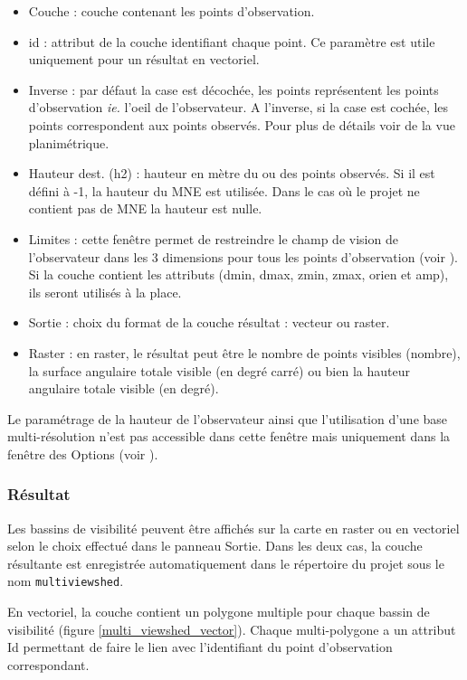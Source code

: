 \documentclass{report}
\begin{document}
\begin{itemize}
	\item Couche : couche contenant les points d'observation.
	\item id : attribut de la couche identifiant chaque point. Ce paramètre est utile uniquement pour un résultat en vectoriel.
	\item Inverse : par défaut la case est décochée, les points représentent les points d'observation \textit{ie.} l'oeil de l'observateur. A l'inverse, si la case est cochée, les points correspondent aux points observés. Pour plus de détails voir  de la vue planimétrique.
	\item Hauteur dest. (h2) : hauteur en mètre du ou des points observés. Si il est défini à -1, la hauteur du MNE est utilisée. Dans le cas où le projet ne contient pas de MNE la hauteur est nulle.
	\item Limites : cette fenêtre permet de restreindre le champ de vision de l'observateur dans les 3 dimensions pour tous les points d'observation (voir ). Si la couche contient les attributs (dmin, dmax, zmin, zmax, orien et amp), ils seront utilisés à la place.
	\item Sortie : choix du format de la couche résultat : vecteur ou raster.
	\item Raster : en raster, le résultat peut être le nombre de points visibles (nombre), la surface angulaire totale visible (en degré carré) ou bien la hauteur angulaire totale visible (en degré).
\end{itemize}

Le paramétrage de la hauteur de l'observateur ainsi que l'utilisation d'une base multi-résolution n'est pas accessible dans cette fenêtre mais uniquement dans la fenêtre des Options (voir ).

\subsubsection{Résultat}
Les bassins de visibilité peuvent être affichés sur la carte en raster ou en vectoriel selon le choix effectué dans le panneau Sortie. Dans les deux cas, la couche résultante est enregistrée automatiquement dans le répertoire du projet sous le nom \verb|multiviewshed|.

En vectoriel, la couche contient un polygone multiple pour chaque bassin de visibilité (figure \ref{multi_viewshed_vector}). Chaque multi-polygone a un attribut Id permettant de faire le lien avec l'identifiant du point d'observation correspondant.
\end{document}
